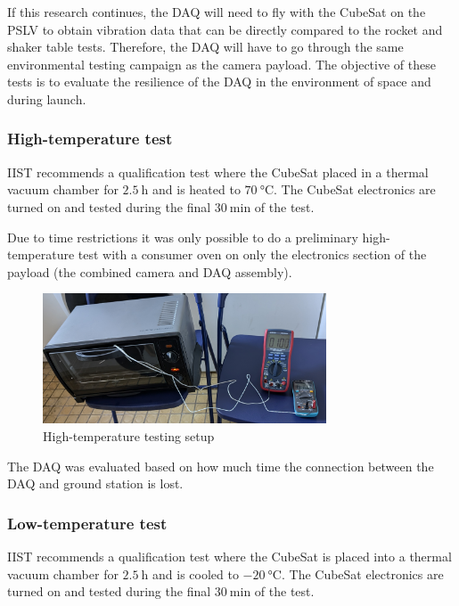 \documentclass[a4paper,11pt]{article}
\begin{document}
If this research continues, the DAQ will need to fly with the CubeSat on the PSLV to obtain vibration data that can be directly compared to the rocket and shaker table tests. Therefore, the DAQ will have to go through the same environmental testing campaign as the camera payload. The objective of these tests is to evaluate the resilience of the DAQ in the environment of space and during launch.

\subsubsection{High-temperature test}
\label{sec:htemp-test-framework}
IIST recommends a qualification test where the CubeSat placed in a thermal vacuum chamber for $\SI{2.5}{\hour}$ and is heated to $\SI{70}{\degreeCelsius}$. The CubeSat electronics are turned on and tested during the final $\SI{30}{\minute}$ of the test.

Due to time restrictions it was only possible to do a preliminary high-temperature test with a consumer oven on only the electronics section of the payload (the combined camera and DAQ assembly).

\begin{figure}[H]
  \centering
  \includegraphics[width=0.75\textwidth]{images/oven_test.jpg}
  \caption{High-temperature testing setup}
  \label{fig:temperature-testing-oven}
\end{figure}

The DAQ was evaluated based on how much time the connection between the DAQ and ground station is lost.

\subsubsection{Low-temperature test}
\label{sec:ltemp-test-framework}
IIST recommends a qualification test where the CubeSat is placed into a thermal vacuum chamber for $\SI{2.5}{\hour}$ and is cooled to $\SI{-20}{\degreeCelsius}$. The CubeSat electronics are turned on and tested during the final $\SI{30}{\minute}$ of the test.
\end{document}
